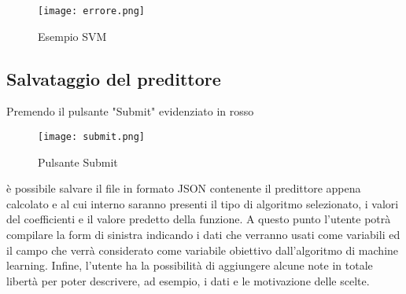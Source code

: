 \documentclass[../manuale-utente.tex]{subfiles}
\begin{document}
\begin{figure}[h!]
  \begin{center}
    \texttt{[image: errore.png]}\\
    \caption{Esempio SVM}%
    \label{fig:SVM}
  \end{center}
  \end{figure}

\newpage

\subsection{Salvataggio del predittore}
\label{subs:salvataggio-del-predittore}
Premendo il pulsante "Submit" evidenziato in rosso

\begin{figure}[h!]
  \begin{center}
    \texttt{[image: submit.png]}\\
    \caption{Pulsante Submit}%
    \label{fig:pulsante-submit}
  \end{center}
\end{figure}

è possibile salvare il file in formato JSON contenente il predittore appena calcolato e al cui interno saranno presenti il tipo di algoritmo selezionato, i valori del coefficienti e il valore predetto della funzione.
A questo punto l'utente potrà compilare la form di sinistra indicando i dati che verranno usati come variabili ed il campo che verrà considerato come variabile obiettivo dall'algoritmo di machine learning. Infine, l'utente ha la possibilità di aggiungere alcune note in totale libertà per poter descrivere, ad esempio, i dati e le motivazione delle scelte.
\end{document}
